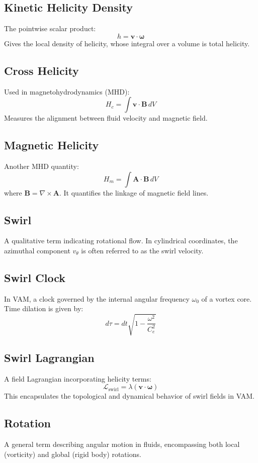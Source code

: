 \documentclass[12pt]{article}
\begin{document}
\subsection*{Kinetic Helicity Density}
The pointwise scalar product:
\[ h = \mathbf{v} \cdot \boldsymbol{\omega} \]
Gives the local density of helicity, whose integral over a volume is total helicity.

\subsection*{Cross Helicity}
Used in magnetohydrodynamics (MHD):
\[ H_c = \int \mathbf{v} \cdot \mathbf{B} \, dV \]
Measures the alignment between fluid velocity and magnetic field.

\subsection*{Magnetic Helicity}
Another MHD quantity:
\[ H_m = \int \mathbf{A} \cdot \mathbf{B} \, dV \]
where $\mathbf{B} = \nabla \times \mathbf{A}$. It quantifies the linkage of magnetic field lines.

\subsection*{Swirl}
A qualitative term indicating rotational flow. In cylindrical coordinates, the azimuthal component $v_\theta$ is often referred to as the swirl velocity.

\subsection*{Swirl Clock}
In VAM, a clock governed by the internal angular frequency $\omega_0$ of a vortex core. Time dilation is given by:
\[ d\tau = dt \sqrt{1 - \frac{\omega^2}{C_e^2}} \]

\subsection*{Swirl Lagrangian}
A field Lagrangian incorporating helicity terms:
\[ \mathcal{L}_{\text{swirl}} = \lambda (\mathbf{v} \cdot \boldsymbol{\omega}) \]
This encapsulates the topological and dynamical behavior of swirl fields in VAM.

\subsection*{Rotation}
A general term describing angular motion in fluids, encompassing both local (vorticity) and global (rigid body) rotations.
\end{document}

